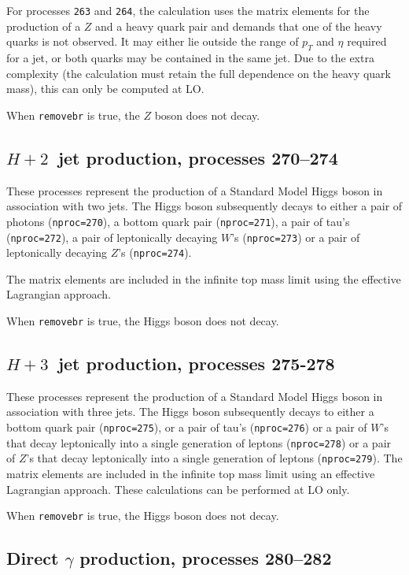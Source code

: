 \documentclass[12pt]{article}
\begin{document}
For processes {\tt 263} and
{\tt 264}, the calculation uses the matrix elements for the production
of a $Z$ and a heavy quark pair and demands that one of the heavy quarks
is not observed. It may either lie outside the range of $p_T$ and $\eta$
required for a jet, or both quarks may be contained in the same jet.
Due to the extra complexity (the calculation must retain the full
dependence on the heavy quark mass), this can only be computed at LO.

When {\tt removebr} is true, the $Z$ boson does not decay.

\subsection{$H + 2$~jet production, processes 270--274}

These processes represent the production of a Standard Model Higgs boson
in association with two jets. The Higgs boson
subsequently decays to either a pair of photons ({\tt nproc=270}), a bottom quark pair ({\tt nproc=271}), 
a pair of tau's ({\tt nproc=272}), a pair of leptonically decaying $W$'s ({\tt nproc=273}) 
or a pair of leptonically decaying $Z$'s ({\tt nproc=274}).

The matrix elements are included in the infinite top mass limit
using the effective Lagrangian approach. 

When {\tt removebr} is true, the Higgs boson does not decay.

\subsection{$H + 3$~jet production, processes 275-278}

These processes represent the production of a Standard Model Higgs boson
in association with three jets. The Higgs boson
subsequently decays to either a bottom quark pair ({\tt nproc=275}), 
or a pair of tau's ({\tt nproc=276})
or a pair of $W$'s that decay leptonically into a single generation of leptons ({\tt nproc=278})
or a pair of $Z$'s that decay leptonically into a single generation of leptons ({\tt nproc=279}).
The matrix elements are included in the infinite top mass limit
using an effective Lagrangian approach. These calculations can be
performed at LO only.

When {\tt removebr} is true, the Higgs boson does not decay.

\subsection{Direct $\gamma$ production, processes 280--282}
\label{subsec:dirphot}
\end{document}
